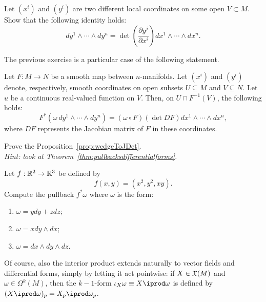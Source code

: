 \begin{exercise}
  Let $(x^i)$ and $(y^i)$ are two different local coordinates on some open $V\subset M$.
  Show that the following identity holds:
  \begin{equation}
    dy^1\wedge\cdots\wedge dy^n = \det\left(\frac{\partial y^j}{\partial x^i}\right) dx^1\wedge\cdots\wedge dx^n.
  \end{equation}
\end{exercise}

The previous exercise is a particular case of the following statement.

\begin{proposition}\label{prop:wedgeToJDet}
  Let $F:M\to N$ be a smooth map between $n$-manifolds.
  Let $(x^i)$ and $(y^i)$ denote, respectively, smooth coordinates on open subsets $U\subseteq M$ and $V\subseteq N$.
  Let $u$ be a continuous real-valued function on $V$.
  Then, on $U\cap F^{-1}(V)$, the following holds:
  \begin{equation}
    F^*(\omega\, dy^1\wedge\cdots\wedge dy^n)
    = (\omega\circ F) (\det DF) dx^1\wedge\cdots\wedge dx^n,
  \end{equation}
  where $DF$ represents the Jacobian matrix of $F$ in these coordinates.
\end{proposition}

\begin{exercise}
  Prove the Proposition~\ref{prop:wedgeToJDet}.\\
  \textit{\small Hint: look at Theorem~\ref{thm:pullbacksdifferentialforms}.}
\end{exercise}

\begin{exercise}
  Let $f: \mathbb{R}^2 \to \mathbb{R}^3$ be defined by
  \begin{equation}
    f(x, y) = (x^2, y^2, xy).
  \end{equation}
  Compute the pullback $f^*\omega$ where $\omega$ is the form:
  \begin{enumerate}
    \item $\omega = y dy + z dz$;
    \item $\omega = x dy \wedge dx$;
    \item $\omega = dx \wedge dy\wedge dz$.
  \end{enumerate}
\end{exercise}

Of course, also the interior product extends naturally to vector fields and differential forms, simply by letting it act pointwise: if $X\in\mathfrak{X}(M)$ and $\omega\in\Omega^k(M)$, then the $k-1$-form $\iota_X\omega\equiv X\iprod\omega$ is defined by $(X\iprod\omega)_p = X_p \iprod \omega_p$.


